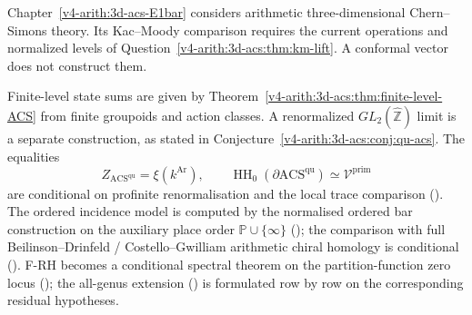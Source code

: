 Chapter~\ref{v4-arith:3d-acs-E1bar} considers arithmetic
three-dimensional Chern--Simons theory. Its Kac--Moody comparison
requires the current operations and normalized levels of
Question~\ref{v4-arith:3d-acs:thm:km-lift}. A conformal vector
does not construct them.

Finite-level state sums are given by
Theorem~\ref{v4-arith:3d-acs:thm:finite-level-ACS} from finite
groupoids and action classes. A renormalized
\(GL_2(\widehat{\mathbb Z})\) limit is a separate construction,
as stated in Conjecture~\ref{v4-arith:3d-acs:conj:qu-acs}. The equalities
\[
Z_{\mathrm{ACS}^{\mathrm{qu}}}=\xi(k^{\mathrm{Ar}}),
\qquad
\operatorname{HH}_{0}(\partial\mathrm{ACS}^{\mathrm{qu}})
\simeq\mathcal{V}^{\mathrm{prim}}
\]
are conditional on profinite renormalisation and the local trace
comparison (). The
ordered incidence model is computed by the normalised ordered bar
construction on the auxiliary place order \(\mathbb{P}\cup\{\infty\}\)
(); the comparison with
full Beilinson--Drinfeld / Costello--Gwilliam arithmetic chiral homology
is conditional ().
F-RH becomes a conditional spectral theorem on the partition-function
zero locus (); the
all-genus extension
() is formulated row
by row on the corresponding residual hypotheses.
